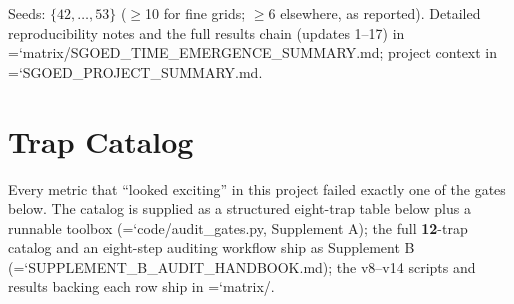 \documentclass[12pt,a4paper]{article}
\renewcommand{\texttt}[1]{{\ttfamily\hyphenchar\font=`\-\relax #1}}
\begin{document}
Seeds: \(\{42,\dots,53\}\) ($\geq$10 for fine grids; $\geq$6 elsewhere, as
reported). Detailed reproducibility notes and the full results chain
(updates 1--17) in \texttt{matrix/SGOED\_TIME\_EMERGENCE\_SUMMARY.md};
project context in \texttt{SGOED\_PROJECT\_SUMMARY.md}.

\endgroup\section{Trap Catalog}\label{appendix-b-trap-catalog}

Every metric that ``looked exciting'' in this project failed exactly one
of the gates below. The catalog is supplied as a structured eight-trap
table below plus a runnable toolbox (\texttt{code/audit\_gates.py},
Supplement A); the full \textbf{12}-trap catalog and an eight-step
auditing workflow ship as Supplement B
(\texttt{SUPPLEMENT\_B\_AUDIT\_HANDBOOK.md}); the v8--v14 scripts and
results backing each row ship in \texttt{matrix/}.
\end{document}
